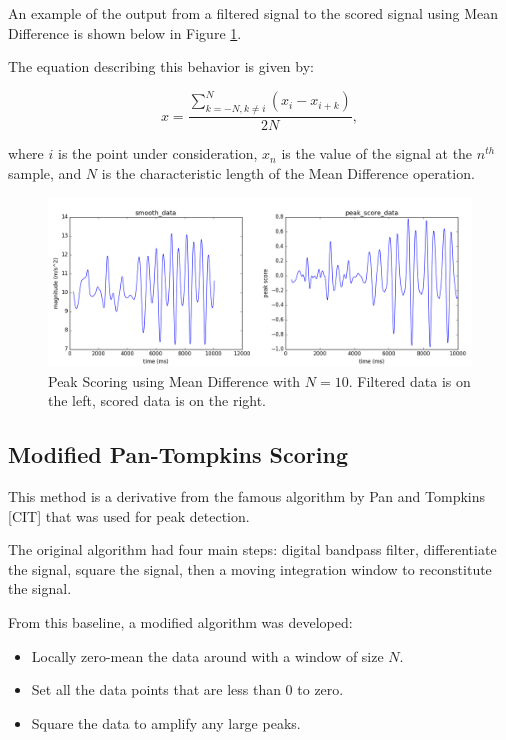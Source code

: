                 An example of the output from a filtered signal to the scored signal using Mean Difference is shown below in Figure \ref{mean_diff_score}.

                The equation describing this behavior is given by:

                \begin{equation}
                x = \frac{\sum_{k=-N, k\neq i}^{N} (x_i - x_{i+k})}{2N},
                \end{equation}

                where $i$ is the point under consideration, $x_n$ is the value of the signal at the $n^{th}$ sample, and $N$ is the characteristic length of the Mean Difference operation.

                \begin{figure}[!th]
                    \includegraphics[width=\textwidth]{Images/mean_diff_score.png}
                    \centering
                    \caption{Peak Scoring using Mean Difference with $N=10$. Filtered data is on the left, scored data is on the right.}
                    \label{mean_diff_score}
                \end{figure}

            \subsection{Modified Pan-Tompkins Scoring}

                This method is a derivative from the famous algorithm by Pan and Tompkins [CIT] that was used for peak detection. 

                The original algorithm had four main steps: digital bandpass filter, differentiate the signal, square the signal, then a moving integration window to reconstitute the signal.

                From this baseline, a modified algorithm was developed:

                \begin{itemize}
                    \item Locally zero-mean the data around with a window of size $N$.
                    \item Set all the data points that are less than 0 to zero.
                    \item Square the data to amplify any large peaks.
                \end{itemize}

